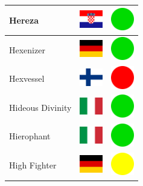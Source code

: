 \documentclass[12pt, a4paper, twoside]{report}
\begin{document}
\begin{center}
\begin{longtable}{|p{5cm}|p{2cm}|p{2cm}|}
 Hereza                                                     & \includegraphics[width=1cm]{../img/flags/hr} &   \includegraphics[width=1cm]{../likes/y} \\ \hline
 Hexenizer                                                  & \includegraphics[width=1cm]{../img/flags/de} &   \includegraphics[width=1cm]{../likes/y} \\ \hline
 Hexvessel                                                  & \includegraphics[width=1cm]{../img/flags/fi} &   \includegraphics[width=1cm]{../likes/n} \\ \hline
 Hideous Divinity                                           & \includegraphics[width=1cm]{../img/flags/it} &   \includegraphics[width=1cm]{../likes/y} \\ \hline
 Hierophant                                                 & \includegraphics[width=1cm]{../img/flags/it} &   \includegraphics[width=1cm]{../likes/y} \\ \hline
 High Fighter                                               & \includegraphics[width=1cm]{../img/flags/de} &   \includegraphics[width=1cm]{../likes/m} \\ \hline

\end{longtable}
\end{center}
\end{document}
